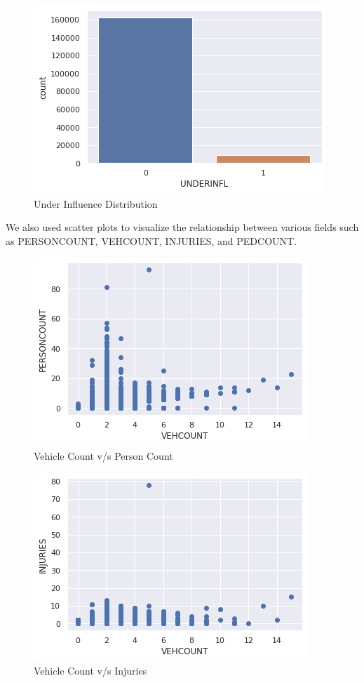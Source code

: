 \documentclass{article}
\begin{document}
\begin{figure}[H]
  \centering
  \includegraphics[scale=0.4]{underinfl.png}
  \caption{Under Influence Distribution}
\end{figure}

We also used scatter plots to visualize the relationship between various fields such as PERSONCOUNT, VEHCOUNT, INJURIES, and PEDCOUNT.

\begin{figure}[H]
  \centering
  \includegraphics[scale=0.4]{vehperson.png}
  \caption{Vehicle Count v/s Person Count}
\end{figure}

\begin{figure}[H]
  \centering
  \includegraphics[scale=0.4]{vehinjuries.png}
  \caption{Vehicle Count v/s Injuries}
\end{figure}
\end{document}
